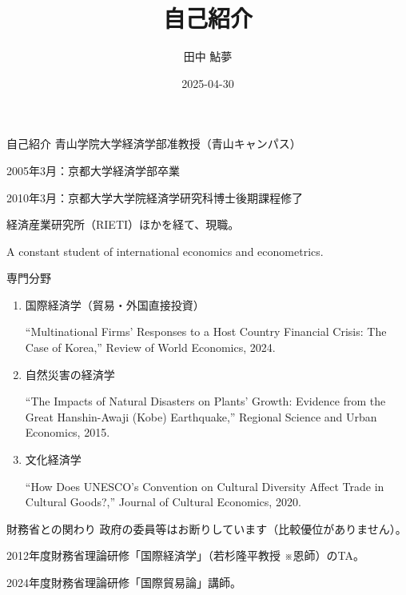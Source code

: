 \documentclass[
  ignorenonframetext,
]{beamer}
\title{自己紹介}
\author{田中 鮎夢}
\date{2025-04-30}
\begin{document}
\frame{\titlepage}

\begin{frame}{自己紹介}
\label{ux81eaux5df1ux7d39ux4ecb}
青山学院大学経済学部准教授（青山キャンパス）

2005年3月：京都大学経済学部卒業

2010年3月：京都大学大学院経済学研究科博士後期課程修了

経済産業研究所（RIETI）ほかを経て、現職。

A constant student of international economics and econometrics.
\end{frame}

\begin{frame}{専門分野}
\label{ux5c02ux9580ux5206ux91ce}
\begin{enumerate}
\item
  国際経済学（貿易・外国直接投資）

  ``Multinational Firms' Responses to a Host Country Financial Crisis:
  The Case of Korea,'' Review of World Economics, 2024.
\item
  自然災害の経済学

  ``The Impacts of Natural Disasters on Plants' Growth: Evidence from
  the Great Hanshin-Awaji (Kobe) Earthquake,'' Regional Science and
  Urban Economics, 2015.
\item
  文化経済学

  ``How Does UNESCO's Convention on Cultural Diversity Affect Trade in
  Cultural Goods?,'' Journal of Cultural Economics, 2020.
\end{enumerate}
\end{frame}

\begin{frame}{財務省との関わり}
\label{ux8ca1ux52d9ux7701ux3068ux306eux95a2ux308fux308a}
政府の委員等はお断りしています（比較優位がありません）。

2012年度財務省理論研修「国際経済学」（若杉隆平教授 ※恩師）のTA。

2024年度財務省理論研修「国際貿易論」講師。
\end{frame}
\end{document}
